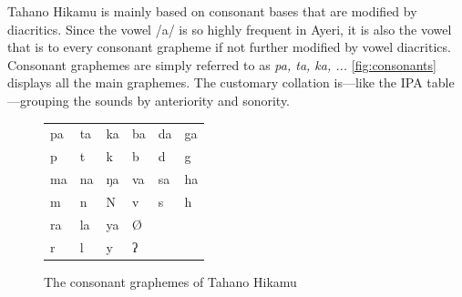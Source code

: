 Tahano Hikamu is mainly based on consonant bases that are modified by 
diacritics. Since the vowel /a/ is so highly frequent in Ayeri, it is also the 
vowel that is  to every consonant grapheme if not further modified 
by vowel diacritics. Consonant graphemes are simply referred to as \textit{pa, 
ta, ka, ...} \autoref{fig:consonants} displays all the main graphemes. The 
customary collation is---like the IPA table---grouping the sounds by 
anteriority and sonority.


\begin{figure}[ht]
\caption{The consonant graphemes of Tahano Hikamu}

\begin{tabu} to \linewidth{X[c] X[c] X[c] X[c] X[c] X[c]}
\toprule
\tableheaderfont	pa & ta & ka & ba & da & ga \\
\rowfont{\Tagati\huge}	p & t & k & b & d & g \\

\midrule

\tableheaderfont	ma & na & ŋa & va & sa & ha \\
\rowfont{\Tagati\huge}	m & n & N & v & s & h \\

\midrule

\tableheaderfont	ra & la & ya & Ø \\
\rowfont{\Tagati\huge}	r & l & y & ʔ \\

\bottomrule
\end{tabu}
\label{fig:thcons}
\end{figure}

